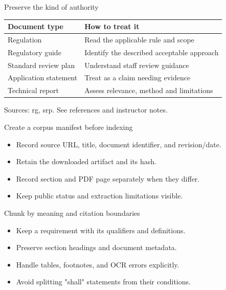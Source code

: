 \documentclass[aspectratio=169,11pt]{beamer}
\begin{document}
\begin{frame}[t,fragile]{Preserve the kind of authority}
\fontsize{10.5}{12.5}\selectfont\setlength{\tabcolsep}{4pt}\renewcommand{\arraystretch}{1.15}
\begin{tabular}{>{\raggedright\arraybackslash}p{}>{\raggedright\arraybackslash}p{}}
\toprule
\textbf{Document type} & \textbf{How to treat it} \\ \midrule
Regulation & Read the applicable rule and scope \\[2pt]
Regulatory guide & Identify the described acceptable approach \\[2pt]
Standard review plan & Understand staff review guidance \\[2pt]
Application statement & Treat as a claim needing evidence \\[2pt]
Technical report & Assess relevance, method and limitations \\[2pt]
\bottomrule\end{tabular}\par\vspace{2mm}
\vfill{\fontsize{6.5}{8}\selectfont\color{UTgray} Sources: rg, srp. See references and instructor notes.\par}
\end{frame}
\begin{frame}[t,fragile]{Create a corpus manifest before indexing}
\fontsize{11.5}{14}\selectfont
\begin{itemize}\setlength{\itemsep}{2mm}
\item Record source URL, title, document identifier, and revision/date.
\item Retain the downloaded artifact and its hash.
\item Record section and PDF page separately when they differ.
\item Keep public status and extraction limitations visible.
\end{itemize}
\end{frame}
\begin{frame}[t,fragile]{Chunk by meaning and citation boundaries}
\fontsize{11.5}{14}\selectfont
\begin{itemize}\setlength{\itemsep}{2mm}
\item Keep a requirement with its qualifiers and definitions.
\item Preserve section headings and document metadata.
\item Handle tables, footnotes, and OCR errors explicitly.
\item Avoid splitting "shall" statements from their conditions.
\end{itemize}
\end{frame}
\end{document}
